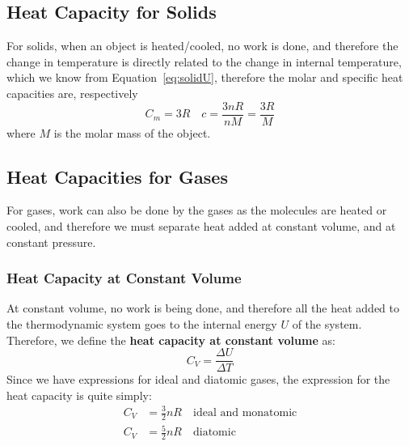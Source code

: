 \documentclass[11pt]{article}
\begin{document}
\subsection{Heat Capacity for Solids}
For solids, when an object is heated/cooled, no work is done, and therefore
the change in temperature is directly related to the change in internal
temperature, which we know from Equation~\ref{eq:solidU}, therefore the
molar and specific heat capacities are, respectively
\begin{equation}
  C_m=3R\quad c=\frac{3nR}{nM}=\frac{3R}M
\end{equation}
where $M$ is the molar mass of the object.


\subsection{Heat Capacities for Gases}
For gases, work can also be done by the gases as the molecules are heated or
cooled, and therefore we must separate heat added at constant volume, and
at constant pressure.

\subsubsection{Heat Capacity at Constant Volume}
At constant volume, no work is being done, and therefore all the heat added
to the thermodynamic system goes to the internal energy $U$ of the system.
Therefore, we define the \textbf{heat capacity at constant volume} as:
\begin{equation}
  C_V =\frac{\Delta U}{\Delta T}
\end{equation}
Since we have expressions for ideal and diatomic gases, the expression for
the heat capacity is quite simply:
\begin{align}
  C_V &=\frac32nR\quad\text{ideal and monatomic}\\
  C_V &=\frac52nR\quad\text{diatomic}
\end{align}
\end{document}
